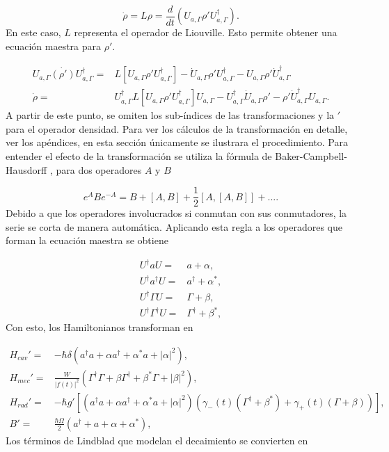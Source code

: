 \documentclass[10pt,a4paper]{report}
\begin{document}
\begin{equation}
\dot{\rho} = L\rho = \frac{d}{dt}(U_{a,\Gamma} \rho' U_{a,\Gamma}^\dagger).
\end{equation} En este caso, $L$ representa el operador de Liouville. Esto permite obtener una ecuación maestra para $\rho'$. 

\begin{align}
 U_{a,\Gamma} \dot{(\rho')} U_{a,\Gamma}^\dagger =& L[U_{a,\Gamma} \rho' U_{a,\Gamma}^\dagger] - \dot{U}_{a,\Gamma}\rho'U_{a,\Gamma}^\dagger -U_{a,\Gamma} \rho' \dot{U}_{a,\Gamma}^\dagger\\
\dot{\rho} =& U_{a,\Gamma}^\dagger L[U_{a,\Gamma} \rho' U_{a,\Gamma}^\dagger]U_{a,\Gamma}-U_{a,\Gamma}^\dagger\dot{U}_{a,\Gamma}\rho'-\rho'\dot{U}_{a,\Gamma}^\dagger U_{a,\Gamma}.
\end{align}A partir de este punto, se omiten los sub-índices de las transformaciones y la $'$ para el operador densidad. Para ver los cálculos de la transformación en detalle, ver los apéndices, en esta sección únicamente se ilustrara el procedimiento. Para entender el efecto de la transformación se utiliza la fórmula de Baker-Campbell-Hausdorff \cite{SakuraiQM}, para dos operadores $A$ y $B$

\begin{equation}
e^{A} B e^{-A} = B + [A,B] + \frac{1}{2}[A,[A,B]] + ... .
\end{equation} Debido a que los operadores involucrados si conmutan con sus conmutadores, la serie se corta de manera automática. Aplicando esta regla a los operadores que forman la ecuación maestra se obtiene

\begin{align}
U^{\dagger} a U =& a + \alpha, \\
U^{\dagger} a^{\dagger} U =& a^{\dagger} + \alpha^*, \\
U^{\dagger} \Gamma U =& \Gamma + \beta, \\
U^{\dagger} \Gamma^{\dagger} U =& \Gamma^{\dagger} + \beta^*, 
\end{align} Con esto, los Hamiltonianos transforman en

\begin{align}
H_{cav}' =& -\hbar \delta(a^{\dagger}a +\alpha a^{\dagger}+\alpha^* a + |\alpha|^2),\\
H_{mec}' =& \frac{W}{|f(t)|^2}(\Gamma^{\dagger}\Gamma + \beta \Gamma^{\dagger} + \beta^* \Gamma + |\beta|^2 ),\\
H_{rad}'=&-\hbar g'[(a^{\dagger}a +\alpha a^{\dagger}+\alpha^* a + |\alpha|^2)(\gamma_-(t)(\Gamma^{\dagger}+\beta^*)+\gamma_+(t)(\Gamma+\beta))],\\
B' =& \frac{\hbar \Omega}{2}(a^{\dagger} + a +\alpha + \alpha^*),
\end{align}Los términos de Lindblad que modelan el decaimiento se convierten en
\end{document}
